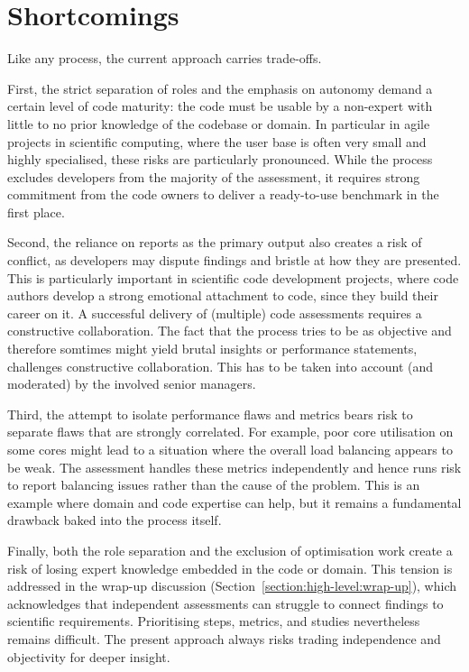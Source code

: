 \section{Shortcomings}


Like any process, the current approach carries trade-offs.

First, the strict separation of roles and the emphasis on autonomy demand a certain level of code maturity: 
the code must be usable by a non-expert with little to no prior knowledge of the codebase or domain. 
In particular in agile projects in scientific computing, where the user base is often very small and highly specialised, these risks are particularly pronounced. 
While the process excludes developers from the majority of the assessment, it requires strong commitment from the code owners to deliver a ready-to-use benchmark in the first place.

Second, the reliance on reports as the primary output also creates a risk of conflict, as developers may dispute findings and bristle at how they are presented.
This is particularly important in scientific code development projects, where code authors develop a strong emotional attachment to code, since they build their career on it.
A successful delivery of (multiple) code assessments requires a constructive collaboration.
The fact that the process tries to be as objective and therefore somtimes might yield brutal insights or performance statements, challenges constructive collaboration.
This has to be taken into account (and moderated) by the involved senior managers. 

Third, the attempt to isolate performance flaws and metrics bears risk to separate flaws that are strongly correlated.
For example, poor core utilisation on some cores might lead to a situation where the overall load balancing appears to be weak.
The assessment handles these metrics independently and hence runs risk to report balancing issues rather than the cause of the problem.
This is an example where domain and code expertise can help, but it remains a fundamental drawback baked into the process itself.

Finally, both the role separation and the exclusion of optimisation work create a risk of losing expert knowledge embedded in the code or domain. 
This tension is addressed in the wrap-up discussion (Section~\ref{section:high-level:wrap-up}), which acknowledges that independent assessments can struggle to connect findings to scientific requirements. 
Prioritising steps, metrics, and studies nevertheless remains difficult. 
The present approach always risks trading independence and objectivity for deeper insight.


 